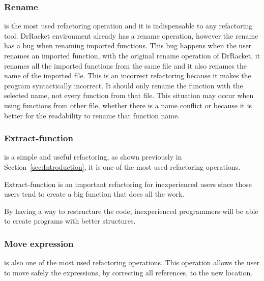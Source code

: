 \subsubsection{Rename}
\label{ssub:Rename}
is the most used refactoring operation and it is indispensable to any refactoring tool.
DrRacket environment already has a rename operation, however the rename has a bug when renaming imported functions.
This bug happens when the user renames an imported function, with the original rename operation of DrRacket, it renames all the imported functions from the same file and it also renames the name of the imported file.
This is an incorrect refactoring because it makes the program syntactically incorrect. It should only rename the function with the selected name, not every function from that file.
This situation may occur when using functions from other file, whether there is a name conflict or because it is better for the readability to rename that function name.


\subsubsection{Extract-function}

is a simple and useful refactoring, as shown previously in Section~\ref{sec:Introduction}, it is one of the most used refactoring operations.

Extract-function is an important refactoring for inexperienced users since those users tend to create a big function that does all the work.

By having a way to restructure the code, inexperienced programmers will be able to create programs with better structures.




\subsubsection{Move expression}

is also one of the most used refactoring operations.
This operation allows the user to move safely the expressions, by correcting all references, to the new location. 



